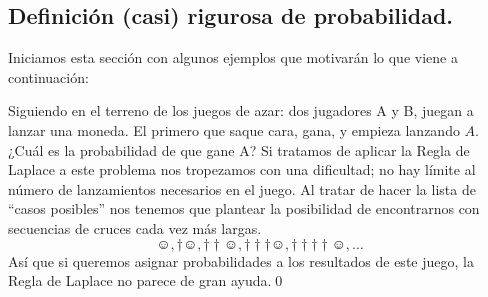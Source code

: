 \subsection{Definición (casi) rigurosa de probabilidad.}
\label{Cap03:def:DefinicionProbabilidad}



Iniciamos esta secci\'on con algunos ejemplos que motivar\'an lo que viene a continuaci\'on:

\begin{Ejemplo}\label{Cap03:ejem:LanzamientoMonedaHastPrimeraCara}
Siguiendo en el terreno de los juegos de azar: dos jugadores A y B, juegan a lanzar una moneda. El primero que saque cara, gana, y empieza lanzando $A$. ¿Cuál es la probabilidad de que gane A?
Si tratamos de aplicar la Regla de Laplace a este problema nos tropezamos con una dificultad; no hay límite al número de lanzamientos necesarios en el juego. Al tratar de hacer la lista de ``casos posibles'' nos tenemos que plantear la posibilidad de encontrarnos con secuencias de cruces cada vez más largas.
    \[
        \smiley, \dag\smiley, \dag \dag\smiley, \dag \dag \dag\smiley, \dag \dag \dag \dag\smiley,\ldots
    \]
Así que si queremos asignar probabilidades a los resultados de este juego, la Regla de Laplace no parece de gran ayuda.\qed
\end{Ejemplo}


